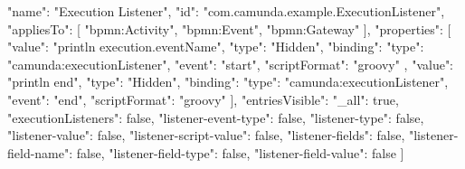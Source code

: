   {
    "name": "Execution Listener",
    "id": "com.camunda.example.ExecutionListener",
    "appliesTo": [
      "bpmn:Activity",
      "bpmn:Event",
      "bpmn:Gateway"
    ],
    "properties": [
      {
        "value": "println execution.eventName",
        "type": "Hidden",
        "binding": {
          "type": "camunda:executionListener",
          "event": "start",
          "scriptFormat": "groovy"
        }
      },
      {
        "value": "println end",
        "type": "Hidden",
        "binding": {
          "type": "camunda:executionListener",
          "event": "end",
          "scriptFormat": "groovy"
        }
      }
    ],
    "entriesVisible": {
      "_all": true,
      "executionListeners": false,
      "listener-event-type": false,
      "listener-type": false,
      "listener-value": false,
      "listener-script-value": false,
      "listener-fields": false,
      "listener-field-name": false,
      "listener-field-type": false,
      "listener-field-value": false
    }
  }
]